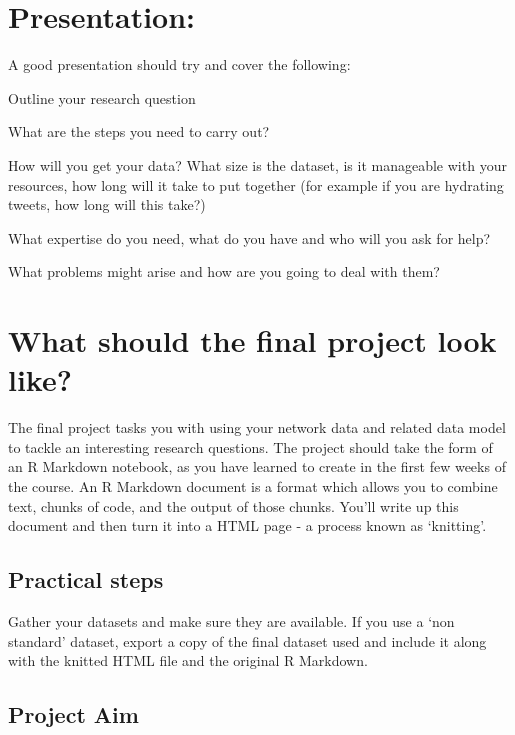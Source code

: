 \documentclass[
]{book}
\begin{document}
\hypertarget{presentation}{%
\section{Presentation:}\label{presentation}}

A good presentation should try and cover the following:

Outline your research question

What are the steps you need to carry out?

How will you get your data? What size is the dataset, is it manageable with your resources, how long will it take to put together (for example if you are hydrating tweets, how long will this take?)

What expertise do you need, what do you have and who will you ask for help?

What problems might arise and how are you going to deal with them?

\hypertarget{what-should-the-final-project-look-like}{%
\section{What should the final project look like?}\label{what-should-the-final-project-look-like}}

The final project tasks you with using your network data and related data model to tackle an interesting research questions. The project should take the form of an R Markdown notebook, as you have learned to create in the first few weeks of the course. An R Markdown document is a format which allows you to combine text, chunks of code, and the output of those chunks. You'll write up this document and then turn it into a HTML page - a process known as `knitting'.

\hypertarget{practical-steps}{%
\subsection{Practical steps}\label{practical-steps}}

Gather your datasets and make sure they are available. If you use a `non standard' dataset, export a copy of the final dataset used and include it along with the knitted HTML file and the original R Markdown.

\hypertarget{project-aim}{%
\subsection{Project Aim}\label{project-aim}}
\end{document}
